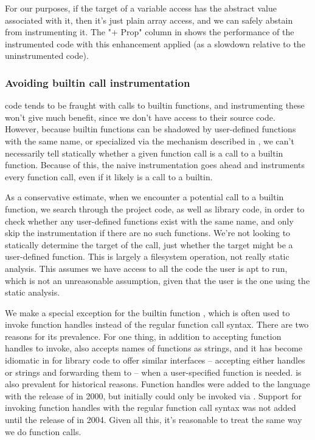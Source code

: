 For our purposes, if the target of a variable access has the  abstract
value associated with it, then it's just plain array access, and we can safely
abstain from instrumenting it. The "+ Prop" column in
 shows the performance of the instrumented
code with this enhancement applied (as a slowdown relative to the
uninstrumented code).

\subsubsection{Avoiding builtin call instrumentation}

\matlab code tends to be fraught with calls to builtin functions, and
instrumenting these won't give much benefit, since we don't have access to
their source code. However, because \matlab builtin functions can be shadowed
by user-defined functions with the same name, or specialized via the mechanism
described in , we can't necessarily tell statically
whether a given function call is a call to a builtin function. Because of this,
the naive instrumentation goes ahead and instruments every function call, even
if it likely is a call to a builtin.

As a conservative estimate, when we encounter a potential call to a builtin
function, we search through the project code, as well as library code, in
order to check whether any user-defined functions exist with the same name,
and only skip the instrumentation if there are no such functions. We're not
looking to statically determine the target of the call, just whether the
target might be a user-defined function. This is largely a filesystem
operation, not really static analysis. This assumes we have access to all the
code the user is apt to run, which is not an unreasonable assumption, given
that the user is the one using the static analysis.

We make a special exception for the builtin function , which is
often used to invoke function handles instead of the regular function call
syntax. There are two reasons for its prevalence. For one thing, in addition to
accepting function handles to invoke,  also accepts names of
functions as strings, and it has become idiomatic in \matlab for library code
to offer similar interfaces -- accepting either handles or strings and
forwarding them to  -- when a user-specified function is needed.
 is also prevalent for historical reasons. Function handles were
added to the language with the release of  in 2000, but initially
could only be invoked via . Support for invoking function handles
with the regular function call syntax was not added until the release of
 in 2004. Given all this, it's reasonable to treat  the
same way we do function calls.

